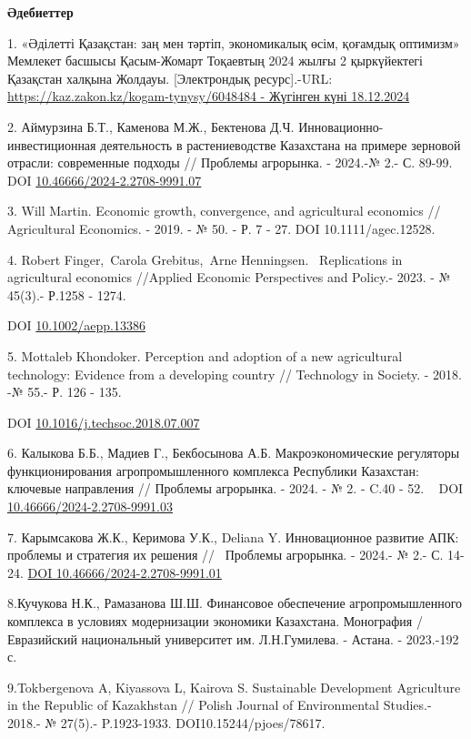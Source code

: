 {{{\bfseries Әдебиеттер}

1. «Әділетті Қазақстан: заң мен тәртіп, экономикалық өсім, қоғамдық
оптимизм» Мемлекет басшысы Қасым-Жомарт Тоқаевтың 2024 жылғы 2
қыркүйектегі Қазақстан халқына Жолдауы. {[}Электрондық ресурс{]}.-URL:
\href{https://kaz.zakon.kz/kogam-tynysy/6048484\%20-\%2018.12.2024}{https://kaz.zakon.kz/kogam-tynysy/6048484
- Жүгінген күні 18.12.2024}

2. Аймурзина Б.Т., Каменова М.Ж., Бектенова Д.Ч.
Инновационно-инвестиционная деятельность в растениеводстве Казахстана на
примере зерновой отрасли: современные подходы // Проблемы агрорынка. -
2024.-№ 2.- С. 89-99. DOI
\href{https://doi.org/10.46666/2024-2.2708-9991.07}{10.46666/2024-2.2708-9991.07}

3. Will Martin. Economic growth, convergence, and agricultural economics
// Agricultural Economics. - 2019. - № 50. - Р. 7 - 27. DOI
10.1111/agec.12528.

4. Robert Finger,~Carola Grebitus,~Arne Henningsen. ~Replications in
agricultural economics //Applied Economic Perspectives and Policy.-
2023. - № 45(3).- Р.1258 - 1274.

DOI \href{https://doi.org/10.1002/aepp.13386}{10.1002/aepp.13386}

5. Mottaleb Khondoker. Perception and adoption of a new agricultural
technology: Evidence from a developing country // Technology in Society.
- 2018. -№ 55.- Р. 126 - 135.

DOI
\href{http://dx.doi.org/10.1016/j.techsoc.2018.07.007}{10.1016/j.techsoc.2018.07.007}

6. Калыкова Б.Б., Мадиев Г., Бекбосынова А.Б. Макроэкономические
регуляторы функционирования агропромышленного комплекса Республики
Казахстан: ключевые направления // Проблемы агрорынка. - 2024. - № 2. -
C.40 - 52. ~ DOI
\href{https://doi.org/10.46666/2024-2.2708-9991.03}{10.46666/2024-2.2708-9991.03}

7. Карымсакова Ж.К., Керимова У.К., Deliana Y. Инновационное развитие
АПК: проблемы и стратегия их решения // ~Проблемы агрорынка. - 2024.- №
2.- С. 14-24. \href{https://doi.org/10.46666/2024-2.2708-9991.01}{DOI
10.46666/2024-2.2708-9991.01}

8.Кучукова Н.К., Рамазанова Ш.Ш. Финансовое обеспечение
агропромышленного комплекса в условиях модернизации экономики
Казахстана. Монография / Евразийский национальный университет им.
Л.Н.Гумилева. - Астана. - 2023.-192 с.

9.Tokbergenova A, Kiyassova L, Kairova S. Sustainable Development
Agriculture in the Republic of Kazakhstan // Polish Journal of
Environmental Studies.- 2018.- № 27(5).- P.1923-1933.
DOI10.15244/pjoes/78617.

}}
